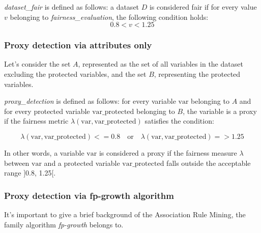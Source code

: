 \textit{dataset\_fair} is defined as follows: a dataset \( D \) is considered fair if for every value \( v \) belonging to \textit{fairness\_evaluation}, the following condition holds:
\[ 0.8  < v < 1.25 \] 

\subsubsection{Proxy detection via attributes only}

Let's consider the set \( A \), represented as the set of all variables in the dataset excluding the protected variables, and the set \( B \), representing the protected variables.

\textit{proxy\_detection} is defined as follows: for every variable \( \text{var} \) belonging to \( A \) and for every protected variable \( \text{var\_protected} \) belonging to \( B \), the variable is a proxy if the fairness metric \( \lambda(\text{var}, \text{var\_protected}) \) satisfies the condition:

\[
\lambda(\text{var}, \text{var\_protected}) <= 0.8 \quad \text{or} \quad \lambda(\text{var}, \text{var\_protected}) => 1.25
\]

In other words, a variable \( \text{var} \) is considered a proxy if the fairness measure \( \lambda \) between \( \text{var} \) and a protected variable \( \text{var\_protected} \) falls outside the acceptable range ]0.8, 1.25[.

\subsubsection{Proxy detection via fp-growth algorithm}

It's important to give a brief background of the Association Rule Mining, the family algorithm \emph{fp-growth} belongs to.


